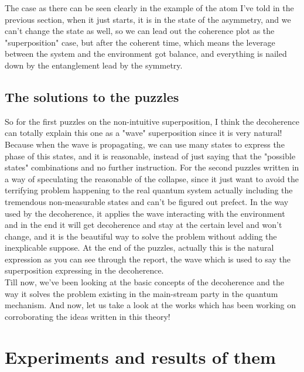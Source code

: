 \documentclass[final,1p,12pt]{elsarticle}
\begin{document}
The case as there can be seen clearly in the example of the atom I've told in the previous section, when it just starts, it is in the state of the asymmetry, and we can't change the state as well, so we can lead out the coherence plot as the "superposition" case, but after the coherent time, which means the leverage between the system and the environment got balance, and everything is nailed down by the entanglement lead by the symmetry.\\

\subsection{The solutions to the puzzles}
So for the first puzzles on the non-intuitive superposition, I think the decoherence can totally explain this one as a "wave" superposition since it is very natural! Because when the wave is propagating, we can use many states to express the phase of this states, and it is reasonable, instead of just saying that the "possible states" combinations and no further instruction. For the second puzzles written in a way of speculating the reasonable of the collapse, since it just want to avoid the terrifying problem happening to the real quantum system actually including the tremendous non-measurable states and can't be figured out prefect.  In the way used by the decoherence, it applies the wave interacting with the environment and in the end it will get decoherence and stay at the certain level and won't change, and it is the beautiful way to solve the problem without adding the inexplicable suppose. At the end of the puzzles, actually this is the natural expression as you can see through the report, the wave which is used to say the superposition expressing in the decoherence.\\

Till now, we've been looking at the basic concepts of the decoherence and the way it solves the problem existing in the main-stream party in the quantum mechanism. And now, let us take a look at the works which has been working on corroborating the ideas written in this theory!

\section{Experiments and results of them} 


\newpage

%
%
\end{document}
